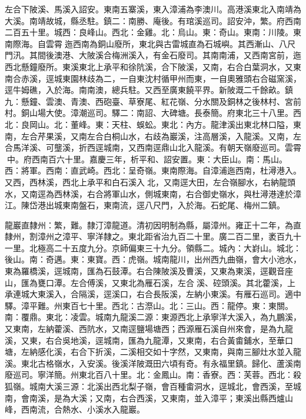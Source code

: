 \begin{pinyinscope}
左合下陂溪、馬溪入詔安。東南五寨溪，東入漳浦為李澳川。高港溪東北入南靖為大溪。南靖故城，縣丞駐。鎮二：南勝、庵後。有琯溪巡司。詔安沖，繁。府西南二百五十里。城西：良峰山。西北：金雞。北：烏山。東：奇山。東南：川陵。東南際海。自雲霄迤西南為銅山廢所，東北與古雷城直為石城嶼。其西漸山、八尺門汛。其間後澳港、大陂溪合梅洲溪入，有金石廢司。其南南浦，又西南宮前，迤西北懸鐘廢所。東溪東北上承平和徐阬溪，合下陂溪，又南，右合白葉洞水，又東南合赤溪，逕城東園林歧為二，一自東沈村循甲州而東，一自奧雅頭右合磁窯溪，逕牛姆礁，入於海。南南澳，總兵駐。又西至廣東饒平界。新陂溉二千餘畝。鎮九：懸鐘、雲澳、青澳、西砲臺、草寮尾、紅花嶺、分水關及銅林之後林村、宮前村。銅山場大使。漳潮巡司。驛二：南詔、大碑塘。長泰簡。府東北三十八里。西北：良岡山。北：董峰。東：天柱、蜈蚣。東北：內方。龍津溪出東北林口隘，東南，左合芹果溪，又南左合白桐山水，右歧為巖溪，注高層溪，入龍溪。又南，左合馬洋溪、可壟溪，折西逕城南，又西南逕鼎山北入龍溪。有朝天嶺廢巡司。雲霄中。府西南百六十里。嘉慶三年，析平和、詔安置。東：大臣山。南：馬山。西：將軍。西南：直武崎。西北：呈奇嶺。東南際海。自漳浦迤西南，杜潯港入。又西，西林溪，西北上承平和白石溪入北，又南逕大田，左合嶺腳水，右納龍頭水，又南逕為西林溪，右合將軍山水，側城東南，右合御史嶺水，與杜潯港達於漳江。陳岱港出城東南盤石，東南流，逕八尺門，入於海。石蛇尾、梅州二鎮。

龍巖直隸州：繁，難。隸汀漳龍道。清初因明制為縣，屬漳州。雍正十二年，為直隸州，割漳州之漳平、寧洋隸之。東北距省治九百二十里。廣二百二里，袤百九十一里。北極高二十五度九分。京師偏東三十九分。領縣二。城內：大崶山。城北：後山。南：奇邁。東：東寶。西：虎嶺。城南龍川，出州西九曲嶺，會大小池水，東為羅橋溪，逕城南，匯為石鼓潭。右合陳陂溪及曹溪，又東為東溪，逕觀音座山，匯為甕口潭。左合傅溪，又東北為雁石溪，左合溪、硿頭溪。其北藿溪，上承連城大東溪入，合隔溪，逕溪口，右合長阪溪，左納小東溪。有雁石巡司。適中驛。漳平難。州東百七十里。西北：古漈山。北：三山。西：龍停。東：東關。南：覆鼎。東北：凌雲。城南九龍溪二源：東源西北上承寧洋大溪入，為九鵬溪，又東南，左納藿溪、西阬水，又南逕鹽場塘西；西源雁石溪自州來會，是為九龍溪，又東，右合吳地溪，逕城南，匯為九龍潭，又東南，右合黃畬鋪水，至華口塘，左納感化溪，右合下折溪，二溪相交如十字然，又東南，與南三腳灶水並入龍溪。東北古格嶺水，入安溪。後溪洋陂溉田六頃有奇。有永福里鎮。歸化、蘆溪南廢巡司。寧洋簡。州東北百八十里。北：金鳳山。南：香寮。西：芙蓉。西北：殺狐嶺。城南大溪三源：北溪出西北梨子嶺，會百種畬洞水，逕城北，會西溪，至城南，會南溪，是為大溪；又南，右合西溪，又東南，並入漳平；東溪出縣西爐山峰，西南流，合熱水、小溪水入龍巖。


\end{pinyinscope}
